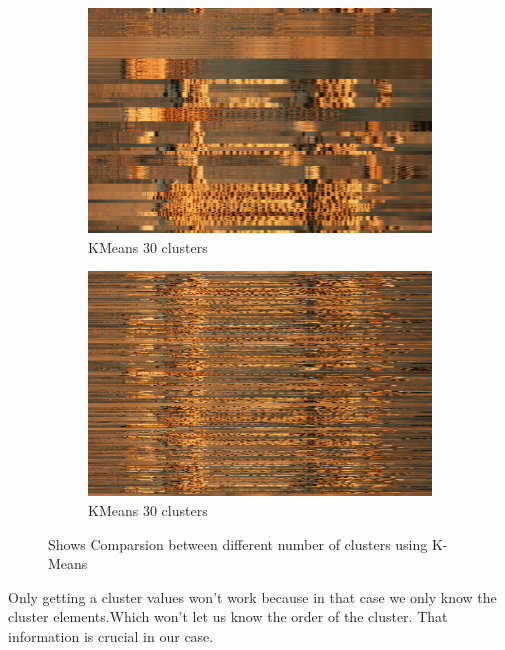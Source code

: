 \documentclass{article}
\begin{document}
\begin{figure}[H]
\begin{subfigure}{.5\textwidth}
\vspace{5mm}
  \centering
\includegraphics[scale=0.15]{kmeans_30.png}
  \caption{KMeans 30 clusters}
  \label{fig:sfig3}
  \vspace{5mm}
\end{subfigure}
\begin{subfigure}{.5\textwidth}
\vspace{5mm}
  \centering
\includegraphics[scale=0.15]{kmeans_399.png}
  \caption{KMeans 30 clusters}
  \label{fig:sfig4}
  \vspace{5mm}
\end{subfigure}
\caption{Shows Comparsion between different number of clusters using K-Means}
\end{figure}
Only getting a cluster values won't work because in that case we only know the cluster elements.Which won't let us know the order of the cluster. That information is crucial in our case.\\
\end{document}

